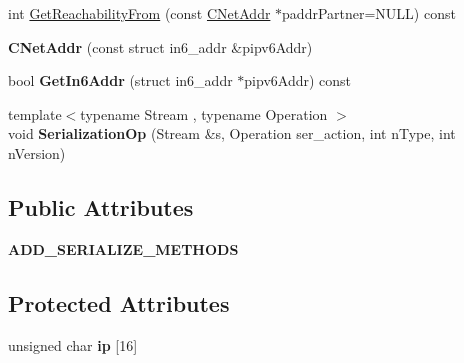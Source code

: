 \begin{DoxyCompactItemize}
\item 
int \mbox{\hyperlink{class_c_net_addr_aa68c7d6112b22759dcd280ddad30808f}{Get\+Reachability\+From}} (const \mbox{\hyperlink{class_c_net_addr}{C\+Net\+Addr}} $\ast$paddr\+Partner=N\+U\+LL) const
\item 
\mbox{\label{class_c_net_addr_a9eae4232457f7659a157467274d1b444}} 
{\bfseries C\+Net\+Addr} (const struct in6\+\_\+addr \&pipv6\+Addr)
\item 
\mbox{\label{class_c_net_addr_a3616012f94b27148e5b8e27d943d4884}} 
bool {\bfseries Get\+In6\+Addr} (struct in6\+\_\+addr $\ast$pipv6\+Addr) const
\item 
\mbox{\label{class_c_net_addr_a7c914d155a533f64f8aa0d2f9bfff8a7}} 
{\footnotesize template$<$typename Stream , typename Operation $>$ }\\void {\bfseries Serialization\+Op} (Stream \&s, Operation ser\+\_\+action, int n\+Type, int n\+Version)
\end{DoxyCompactItemize}
\subsection*{Public Attributes}
\begin{DoxyCompactItemize}
\item 
\mbox{\label{class_c_net_addr_ab08e22719f96b42c61e998158a895e5f}} 
{\bfseries A\+D\+D\+\_\+\+S\+E\+R\+I\+A\+L\+I\+Z\+E\+\_\+\+M\+E\+T\+H\+O\+DS}
\end{DoxyCompactItemize}
\subsection*{Protected Attributes}
\begin{DoxyCompactItemize}
\item 
\mbox{\label{class_c_net_addr_acff7ce68f33f8dfbfe6d79d80928d417}} 
unsigned char {\bfseries ip} \mbox{[}16\mbox{]}
\end{DoxyCompactItemize}
